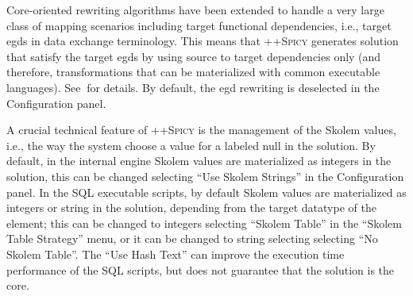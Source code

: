 \documentclass[12pt]{article}
\newcommand{\spicypp}{\textsc{++Spicy}}
\newcommand{\tld}{$~$}
\newcommand{\quotes}[1]{``#1''}
\begin{document}
Core-oriented rewriting algorithms have been extended to handle a very large class of mapping scenarios including target functional dependencies, i.e., target egds in data exchange terminology. This means that {\spicypp} generates solution that satisfy the target egds by using source to target dependencies only (and therefore, transformations that can be materialized with common executable languages). See\tld\cite{Marnette2010} for details.
By default, the egd rewriting is deselected in the Configuration panel.

A crucial technical feature of {\spicypp} is the management of the Skolem values, i.e., the way the system choose a value for a labeled null in the solution. 
By default, in the internal engine Skolem values are materialized as integers in the solution, this can be changed selecting \quotes{Use Skolem Strings}  in the Configuration panel.
In the SQL executable scripts, by default Skolem values are materialized as integers or string in the solution, depending from the target datatype of the element; this can be changed to integers selecting \quotes{Skolem Table} in the \quotes{Skolem Table Strategy} menu, or it can be changed to string selecting selecting \quotes{No Skolem Table}. The \quotes{Use Hash Text} can improve the execution time performance of the SQL scripts, but does not guarantee that the solution is the core.










\end{document}
